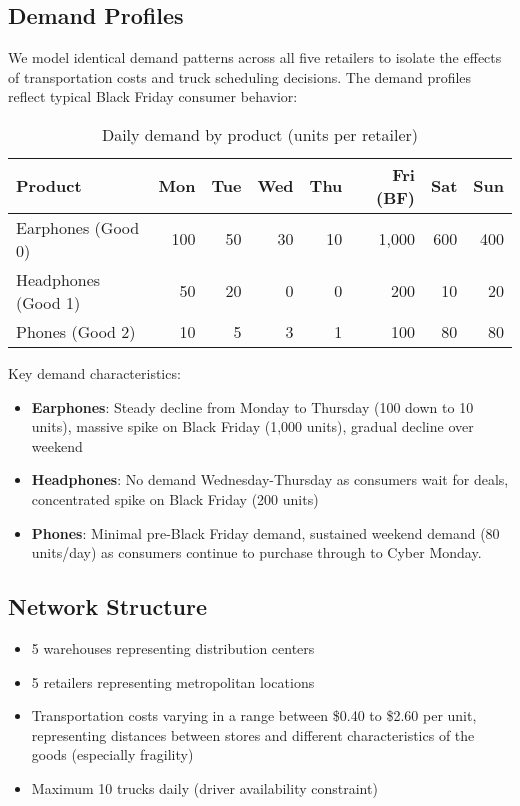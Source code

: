\documentclass[a4paper,12pt]{article}
\begin{document}
\subsection{Demand Profiles}\label{subsec:demand-profiles}

We model identical demand patterns across all five retailers to isolate the effects of transportation costs and truck scheduling decisions.
The demand profiles reflect typical Black Friday consumer behavior:

\begin{table}[h]
\centering
\caption{Daily demand by product (units per retailer)}
\begin{tabular}{lrrrrrrr}
\toprule
Product & Mon & Tue & Wed & Thu & Fri (BF) & Sat & Sun \\
\midrule
Earphones (Good 0) & 100 & 50 & 30 & 10 & 1,000 & 600 & 400 \\
Headphones (Good 1) & 50 & 20 & 0 & 0 & 200 & 10 & 20 \\
Phones (Good 2) & 10 & 5 & 3 & 1 & 100 & 80 & 80 \\
\bottomrule
\end{tabular}\label{tab:table2}
\end{table}

Key demand characteristics:
\begin{itemize}
    \item \textbf{Earphones}: Steady decline from Monday to Thursday (100 down to 10 units), massive spike on Black Friday (1,000 units), gradual decline over weekend
    \item \textbf{Headphones}: No demand Wednesday-Thursday as consumers wait for deals, concentrated spike on Black Friday (200 units)
    \item \textbf{Phones}: Minimal pre-Black Friday demand, sustained weekend demand (80 units/day) as consumers continue to purchase through to Cyber Monday.
\end{itemize}

\subsection{Network Structure}\label{subsec:network-structure}
\begin{itemize}
    \item 5 warehouses representing distribution centers
    \item 5 retailers representing metropolitan locations
    \item Transportation costs varying in a range between \$0.40 to \$2.60 per unit, representing distances between stores and different characteristics of the goods (especially fragility)
    \item Maximum 10 trucks daily (driver availability constraint)
\end{itemize}
\end{document}
